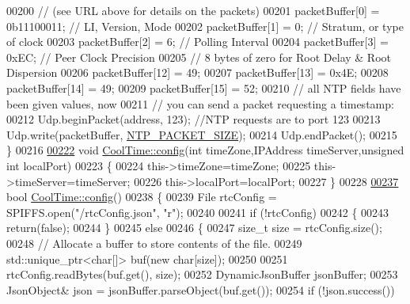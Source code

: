 \begin{DoxyCode}
00200     \textcolor{comment}{// (see URL above for details on the packets)}
00201     packetBuffer[0] = 0b11100011;   \textcolor{comment}{// LI, Version, Mode}
00202     packetBuffer[1] = 0;     \textcolor{comment}{// Stratum, or type of clock}
00203     packetBuffer[2] = 6;     \textcolor{comment}{// Polling Interval}
00204     packetBuffer[3] = 0xEC;  \textcolor{comment}{// Peer Clock Precision}
00205     \textcolor{comment}{// 8 bytes of zero for Root Delay & Root Dispersion}
00206     packetBuffer[12]  = 49;
00207     packetBuffer[13]  = 0x4E;
00208     packetBuffer[14]  = 49;
00209     packetBuffer[15]  = 52;
00210     \textcolor{comment}{// all NTP fields have been given values, now}
00211     \textcolor{comment}{// you can send a packet requesting a timestamp:                 }
00212     Udp.beginPacket(address, 123); \textcolor{comment}{//NTP requests are to port 123}
00213     Udp.write(packetBuffer, \hyperlink{_cool_time_8h_a56a6ea64006651b4f42adf713e244f06}{NTP\_PACKET\_SIZE});
00214     Udp.endPacket();    
00215 \}
00216 
\hyperlink{class_cool_time_ae5528ed0ba9e78c711084968054950e0}{00222} \textcolor{keywordtype}{void} \hyperlink{class_cool_time_a87c28260c1bc77091162cbcf1ee2e129}{CoolTime::config}(\textcolor{keywordtype}{int} timeZone,IPAddress timeServer,\textcolor{keywordtype}{unsigned} \textcolor{keywordtype}{int} localPort)
00223 \{
00224     this->timeZone=timeZone;
00225     this->timeServer=timeServer;
00226     this->localPort=localPort;
00227 \} 
00228 
\hyperlink{class_cool_time_a87c28260c1bc77091162cbcf1ee2e129}{00237} \textcolor{keywordtype}{bool} \hyperlink{class_cool_time_a87c28260c1bc77091162cbcf1ee2e129}{CoolTime::config}()
00238 \{
00239     File rtcConfig = SPIFFS.open(\textcolor{stringliteral}{"/rtcConfig.json"}, \textcolor{stringliteral}{"r"});
00240 
00241     \textcolor{keywordflow}{if} (!rtcConfig) 
00242     \{
00243         \textcolor{keywordflow}{return}(\textcolor{keyword}{false});
00244     \}
00245     \textcolor{keywordflow}{else}
00246     \{
00247         \textcolor{keywordtype}{size\_t} size = rtcConfig.size();
00248         \textcolor{comment}{// Allocate a buffer to store contents of the file.}
00249         std::unique\_ptr<char[]> buf(\textcolor{keyword}{new} \textcolor{keywordtype}{char}[size]);
00250 
00251         rtcConfig.readBytes(buf.get(), size);
00252         DynamicJsonBuffer jsonBuffer;
00253         JsonObject& json = jsonBuffer.parseObject(buf.get());
00254         \textcolor{keywordflow}{if} (!json.success()) 

\end{DoxyCode}
